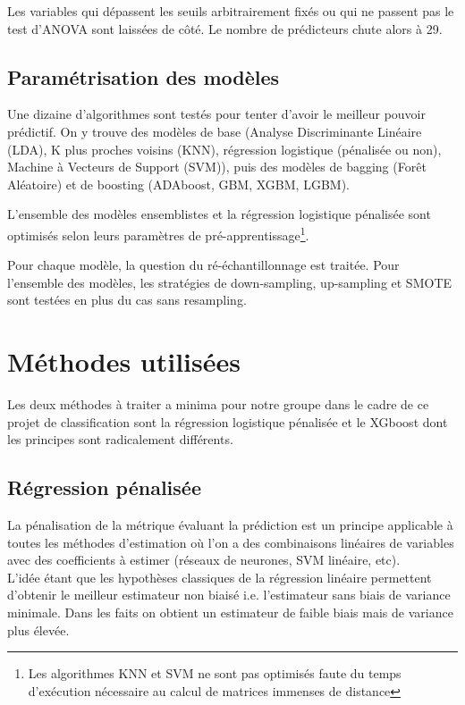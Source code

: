 \documentclass[french]{article}
\begin{document}
\begin{multicols}{2}
Les variables qui dépassent les seuils arbitrairement fixés ou qui ne passent pas le test d'ANOVA sont laissées de côté. Le nombre de prédicteurs chute alors à 29. %

\subsection{Paramétrisation des modèles}

Une dizaine d'algorithmes sont testés pour tenter d'avoir le meilleur pouvoir prédictif. On y trouve des modèles de base (Analyse Discriminante Linéaire (LDA), K plus proches voisins (KNN), régression logistique (pénalisée ou non), Machine à Vecteurs de Support (SVM)), puis des modèles de bagging (Forêt Aléatoire) et de boosting (ADAboost, GBM, XGBM, LGBM).

L'ensemble des modèles ensemblistes et la régression logistique pénalisée sont optimisés selon leurs paramètres de pré-apprentissage\footnote{Les algorithmes KNN et SVM ne sont pas optimisés faute du temps d'exécution nécessaire au calcul de matrices immenses de distance}.

Pour chaque modèle, la question du ré-échantillonnage est traitée. Pour l'ensemble des modèles, les stratégies de down-sampling, up-sampling et SMOTE sont testées en plus du cas sans resampling.





\section{Méthodes utilisées}
Les deux méthodes à traiter a minima pour notre groupe dans le cadre de ce projet de classification sont la régression logistique pénalisée et le XGboost dont les principes sont radicalement différents.


\subsection{Régression pénalisée}
La pénalisation de la métrique évaluant la prédiction est un principe applicable à toutes les méthodes d'estimation où l’on a des combinaisons linéaires de variables avec des coefficients à estimer (réseaux de neurones, SVM linéaire, etc).\\
L'idée étant que les hypothèses classiques de la régression linéaire permettent d'obtenir le meilleur estimateur non biaisé i.e. l'estimateur sans biais de variance minimale. Dans les faits on obtient un estimateur de faible biais mais de variance plus élevée.


\end{multicols}
\end{document}
